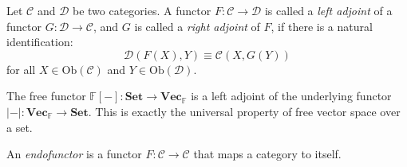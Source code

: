 \documentclass[
	11pt, %
	fleqn, %
	a4paper, %
]{LegrandOrangeBook}
\newcommand{\F}{\mathbb{F}} %
\newcommand{\C}{\mathcal{C}} %
\newcommand{\Set}{\textbf{Set}} %
\newcommand{\Vect}{\textbf{Vec}} %
\newcommand{\Ob}[1]{\text{Ob}(#1)} %
\begin{document}
\begin{definition}
    Let $\C$ and $\mathcal{D}$ be two categories. A functor $F : \C \to \mathcal{D}$ is called a \emph{left adjoint} of a functor $G : \mathcal{D} \to \C$, and $G$ is called a \emph{right adjoint} of $F$, if there is a natural identification:
    \[
        \mathcal{D}(F(X), Y) \equiv \C(X, G(Y))
    \]
    for all $X \in \Ob{\C}$ and $Y \in \Ob{\mathcal{D}}$.
\end{definition}

\begin{example}
    The free functor $\F[-] : \Set \to \Vect_{\F}$ is a left adjoint of the underlying functor $|-| : \Vect_{\F} \to \Set$. This is exactly the universal property of free vector space over a set.
\end{example}

\begin{definition}[Endofunctors]
    An \emph{endofunctor} is a functor $F : \C \to \C$ that maps a category to itself.
\end{definition}
\end{document}
